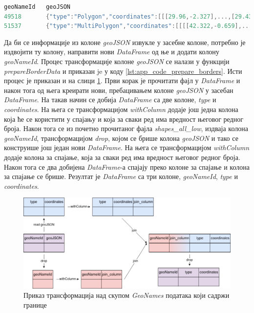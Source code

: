 \documentclass[12pt,oneside]{memoir}
\begin{document}
\begin{lstlisting}[caption={Упрошћени пример редова фајла \textit{shapes\_all\_low}}, language=Scala, label={lst:app_code_shapes_all_low_example}]
geoNameId	geoJSON
49518	    {"type":"Polygon","coordinates":[[[29.96,-2.327],...,[29.438,-2.798]]]}
51537	    {"type":"MultiPolygon","coordinates":[[[[42.322,-0.659],...,[43.451,11.491]]]]}
\end{lstlisting}

Да би се информације из колоне \textit{geoJSON} извукле у засебне колоне, потребно је издвојити ту колону, направити нови \textit{DataFrame} од ње и додати колону \textit{geoNameId}. Процес трансформације колоне \textit{geoJSON} се налази у функцији \textit{prepareBorderData} и приказан je у коду \ref{lst:app_code_prepare_borders}. Исти процес је приказан и на слици \ref{fig:app_code_transofrm_prepare_borders}. Први корак је прочитати фајл у \textit{DataFrame} и након тога од њега креирати нови, пребацивањем колоне \textit{geoJSON} у засебан \textit{DataFrame}. На такав начин се добија \textit{DataFrame} са две колоне, \textit{type} и \textit{coordinates}. На њега се трансформацијом \textit{withColumn} додаје још једна колона која ће се користити у спајању и која за сваки ред има вредност његовог редног броја. Након тога се из почетно прочитаног фајла \textit{shapes\_all\_low}, издваја колона \textit{geoNameId}, трансформацијом \textit{drop}, којом се брише колона \textit{geoJSON} и тако се конструише још један нови \textit{DataFrame}. На њега се трансформацијом \textit{withColumn} додаје колона за спајање, која за сваки ред има вредност његовог редног броја. Након тога се два добијена \textit{DataFrame}-а спајају преко колоне за спајање и колона за спајање се брише. Резултат је \textit{DataFrame} са три колоне, \textit{geoNameId}, \textit{type} и \textit{coordinates}.

\begin{figure}[!ht]
  \centering
  \includegraphics[width=1\textwidth]{pictures/borders_file_thingy.png}
  \caption{Приказ трансформација над скупом \textit{GeoNames} података који садржи границе}
  \label{fig:app_code_transofrm_prepare_borders}
\end{figure}
\end{document}
